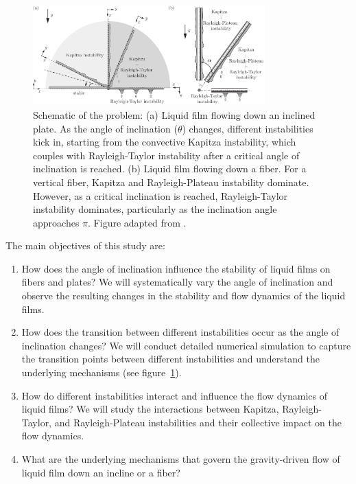 \documentclass[a4paper,10pt]{article}
\begin{document}
\begin{figure}[H]
	\begin{center}
		\includegraphics[width=0.8\textwidth]{DropsOnFibers.pdf}
		\caption{Schematic of the problem: (a) Liquid film flowing down an inclined plate. As the angle of inclination ($\theta$) changes, different instabilities kick in, starting from the convective Kapitza instability, which couples with Rayleigh-Taylor instability after a critical angle of inclination is reached. (b) Liquid film flowing down a fiber. For a vertical fiber, Kapitza and Rayleigh-Plateau instability dominate. However,  as a critical inclination is reached, Rayleigh-Taylor instability dominates, particularly as the inclination angle approaches $\pi$. Figure adapted from \citet{rietz2017dynamics}.}
		\label{Figure::Typical}
\end{center}
\end{figure}

\noindent The main objectives of this study are:

\begin{enumerate}
	\item How does the angle of inclination influence the stability of liquid films on fibers and plates? We will systematically vary the angle of inclination and observe the resulting changes in the stability and flow dynamics of the liquid films.
	
	\item How does the transition between different instabilities occur as the angle of inclination changes? We will conduct detailed numerical simulation to capture the transition points between different instabilities and understand the underlying mechanisms (see figure~\ref{Figure::Typical}). 
	
	\item How do different instabilities interact and influence the flow dynamics of liquid films? We will study the interactions between Kapitza, Rayleigh-Taylor, and Rayleigh-Plateau instabilities and their collective impact on the flow dynamics.
	
	\item What are the underlying mechanisms that govern the gravity-driven flow of liquid film down an incline or a fiber?
		
\end{enumerate}
\end{document}
